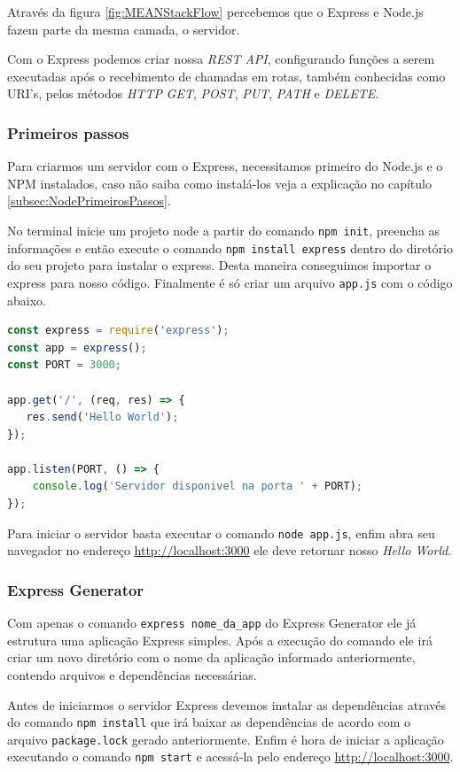 \documentclass[
	12pt,				%
	openright,			%
	twoside,			%
	a4paper,			%
	english,			%
	brazil				%
	]{abntex2}
\begin{document}
Através da figura \ref{fig:MEANStackFlow} percebemos que o Express e Node.js fazem parte da mesma camada, o servidor.

Com o Express podemos criar nossa \textit{REST API}, configurando funções a serem executadas após o recebimento de chamadas em rotas, também conhecidas como URI's, pelos métodos \textit{HTTP} \textit{GET}, \textit{POST}, \textit{PUT}, \textit{PATH} e \textit{DELETE}.

\subsubsection {Primeiros passos}

Para criarmos um servidor com o Express, necessitamos primeiro do Node.js e o NPM instalados, caso não saiba como instalá-los veja a explicação no capítulo \ref{subsec:NodePrimeirosPassos}.

No terminal inicie um projeto node a partir do comando \verb|npm init|, preencha as informações e então execute o comando \verb|npm install express| dentro do diretório do seu projeto para instalar o express. Desta maneira conseguimos importar o express para nosso código. Finalmente é só criar um arquivo \verb|app.js| com o código abaixo.

\begin{lstlisting}[language=javascript]
const express = require('express');
const app = express();
const PORT = 3000;

app.get('/', (req, res) => {
   res.send('Hello World');
});

app.listen(PORT, () => {
    console.log('Servidor disponivel na porta ' + PORT);
});
\end{lstlisting}

Para iniciar o servidor basta executar o comando \verb|node app.js|, enfim abra seu navegador no endereço \href{http://localhost:3000}{http://localhost:3000} ele deve retornar nosso \textit{Hello World}.

\subsubsection{Express Generator}

Com apenas o comando \verb|express nome_da_app| do Express Generator ele já estrutura uma aplicação Express simples. Após a execução do comando ele irá criar um novo diretório com o nome da aplicação informado anteriormente, contendo arquivos e dependências necessárias. 

Antes de iniciarmos o servidor Express devemos instalar as dependências através do comando \verb|npm install| que irá baixar as dependências de acordo com o arquivo \verb|package.lock| gerado anteriormente. Enfim é hora de iniciar a aplicação executando o comando \verb|npm start| e acessá-la pelo endereço \href{http://localhost:3000}{http://localhost:3000}.
\end{document}
